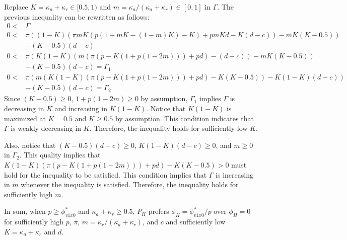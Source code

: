 \par Replace $K = \kappa_a + \kappa_r \in [0.5,1)$ and $m = \kappa_a/(\kappa_a+\kappa_r) \in [0,1]$ in $\Gamma$. The previous inequality can be rewritten as follows:
\begin{align*}
0 <& \Gamma  \\
0 <& \pi ( (1-K)(\pi mK(p(1+mK-(1-m)K)-K)+pmKd-K(d-c)) - mK(K-0.5) ) \\ &- (K-0.5)(d-c) \\
0 <&\pi( K(1-K)(m(\pi(p-K(1+p(1-2m))) + pd) - (d-c)) - mK(K-0.5)) \\ &- (K-0.5)(d-c) = \Gamma_{1}\\
0 <&\pi( m(K(1-K)(\pi(p-K(1+p(1-2m))) + pd) - K(K-0.5)) - K(1-K)(d-c) ) \\ &- (K-0.5)(d-c) = \Gamma_{2}
\end{align*}
\noindent Since $(K-0.5)\geq0$, $1+p(1-2m)\geq 0$ by assumption, $\Gamma_{1}$ implies $\Gamma$ is decreasing in $K$ and increasing in $K(1-K)$. Notice that $K(1-K)$ is maximized at $K=0.5$ and $K\geq0.5$ by assumption. This condition indicates that $\Gamma$ is weakly decreasing in $K$. Therefore, the inequality holds for sufficiently low $K$. 

\par Also, notice that $(K-0.5)(d-c)\geq0$, $K(1-K)(d-c)\geq 0$, and $m\geq0$ in $\Gamma_2$. This quality implies that $K(1-K)(\pi(p-K(1+p(1-2m))) + pd) - K(K-0.5)>0$ must hold for the inequality to be satisfied. This condition implies that $\Gamma$ is increasing in $m$ whenever the inequality is satisfied. Therefore, the inequality holds for sufficiently high $m$.

\par In sum, when $p \geq \phi^*_{v1x0}$ and $\kappa_a+\kappa_r \geq 0.5$, $P_H$ prefers $\phi_H=\phi^*_{v1x0}/p$ over $\phi_H=0$ for sufficiently high $p$, $\pi$, $m = \kappa_r/(\kappa_a+\kappa_r)$, and $c$ and sufficiently low $K = \kappa_a + \kappa_r$ and $d$. 

